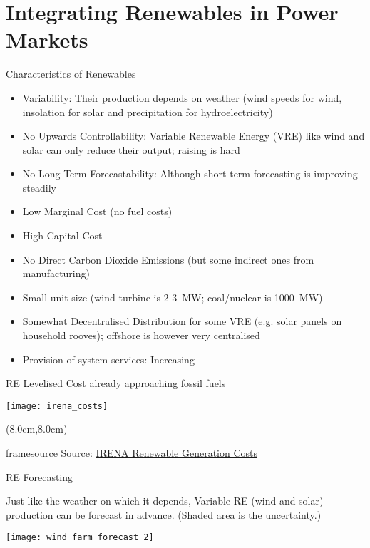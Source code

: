 \documentclass[10pt,dvipsnames]{beamer}
\newcommand{\source}[1]{\begin{textblock*}{4cm}(8.0cm,8.0cm)
    \begin{beamercolorbox}[ht=0.5cm,right]{framesource}
        \usebeamerfont{framesource}\usebeamercolor[fg]{framesource} Source: {#1}
    \end{beamercolorbox}
\end{textblock*}}
\let\olditem\item
\renewcommand{\item}{%
\olditem\vspace{5pt}}
\begin{document}
\section{Integrating Renewables in Power Markets}


\begin{frame}{Characteristics of Renewables}

  \begin{itemize}
  \item \alert{Variability}: Their production depends on weather (wind speeds for wind, insolation for solar and precipitation for hydroelectricity)
  \item \alert{No Upwards Controllability}: Variable Renewable Energy (VRE) like wind and solar can only reduce their output; raising is hard
  \item \alert{No Long-Term Forecastability}: Although short-term forecasting is improving steadily
  \item \alert{Low Marginal Cost} (no fuel costs)
  \item \alert{High Capital Cost}
  \item \alert{No Direct Carbon Dioxide Emissions} (but some indirect ones from manufacturing)
  \item \alert{Small unit size} (wind turbine is 2-3~MW; coal/nuclear is 1000~MW)
  \item \alert{Somewhat Decentralised Distribution} for some VRE (e.g. solar panels on household rooves); offshore is however very centralised
    \item \alert{Provision of system services}: Increasing
  \end{itemize}

\end{frame}

\begin{frame}{RE Levelised Cost already approaching fossil fuels}

  \centering
  \texttt{[image: irena\_costs]}

  \source{\href{http://www.irena.org/DocumentDownloads/Publications/IRENA_RE_Power_Costs_2014_report.pdf}{IRENA Renewable Generation Costs}}
\end{frame}


\begin{frame}{RE Forecasting}

  Just like the weather on which it depends, Variable RE (wind and
  solar) production can be forecast in advance.   (Shaded area is the uncertainty.)

  \centering
  \texttt{[image: wind\_farm\_forecast\_2]}
\end{frame}
\end{document}
